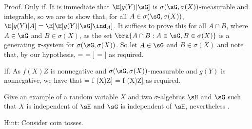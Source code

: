 Proof. Only if. It is immediate that $\E[g(Y)|\sG ]$ is $\sigma(\sG ,\sigma(X))$-measurable and integrable, so we are to show that, for all $A \in \sigma(\sG ,\sigma(X))$, $\E[g(Y)|A] = \E[\E[g(Y)|\sG ]\ind_A]$. It suffices to prove this for all $A\cap B$, where $A \in \sG$ and $B \in \sigma(X)$, as the set $\bra{A\cap B: A \in \sG ,B \in \sigma(X)}$ is a generating $\pi$-system for $\sigma(\sG ,\sigma(X))$. So let $A \in \sG$ and $B \in \sigma(X)$ and note that, by our hypothesis,
\be
{} =  = \E[\ind_A\ind_B\E[g(Y)|\sG ]] = \E[\ind_{A\cap B}\E[g(Y)|\sG ]]
\ee
as required.

If. As $f (X)Z$ is nonnegative and $\sigma(\sG ,\sigma(X))$-measurable and $g(Y)$ is nonnegative, we have that
\be
\E[g(Y) f (X)Z] = \E[\E[g(Y)|\sigma(\sG ,\sigma(X))] f (X)Z] = \E[\E[g(Y)|\sG ] f (X)Z]
\ee
as required.

\vspace{2mm}

\qcutline


\item Give an example of a random variable $X$ and two $\sigma$-algebras $\sH$ and $\sG$ such that $X$ is independent of $\sH$ and $\sG$ is independent of $\sH$, nevertheless
\be
\E[X|\sigma(\sG,\sH)] \neq \E[X|\sG].
\ee

Hint: Consider coin tosses.

\scutline

